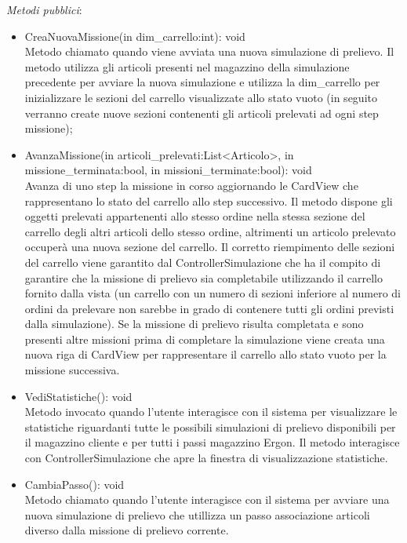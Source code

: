 \textit{Metodi pubblici}:\\
\begin{itemize}
    \item CreaNuovaMissione(in dim\_carrello:int): void\\
    Metodo chiamato quando viene avviata una nuova simulazione di prelievo. Il metodo utilizza gli articoli presenti nel magazzino della simulazione precedente per avviare la nuova simulazione e utilizza 
    la dim\_carrello per inizializzare le sezioni del carrello visualizzate allo stato vuoto (in seguito verranno create nuove sezioni contenenti gli articoli prelevati ad ogni step missione);
    \item AvanzaMissione(in articoli\_prelevati:List<Articolo>, in missione\_terminata:bool, in missioni\_terminate:bool): void\\
    Avanza di uno step la missione in corso aggiornando le CardView che rappresentano lo stato del carrello allo step successivo.
    Il metodo dispone gli oggetti prelevati appartenenti allo stesso ordine nella stessa sezione del carrello degli altri articoli dello stesso ordine, altrimenti un articolo prelevato occuperà
    una nuova sezione del carrello. Il corretto riempimento delle sezioni del carrello viene garantito dal ControllerSimulazione che ha il compito di garantire che la missione di prelievo 
    sia completabile utilizzando il carrello fornito dalla vista (un carrello con un numero di sezioni inferiore al numero di ordini da prelevare non sarebbe in grado di contenere tutti gli ordini previsti dalla simulazione).
    Se la missione di prelievo risulta completata e sono presenti altre missioni prima di completare la simulazione viene creata una nuova riga di CardView per rappresentare il carrello allo stato 
    vuoto per la missione successiva.
    \item VediStatistiche(): void\\
    Metodo invocato quando l'utente interagisce con il sistema per visualizzare le statistiche riguardanti tutte le possibili simulazioni di prelievo disponibili per il magazzino cliente e per tutti i passi magazzino Ergon.
    Il metodo interagisce con ControllerSimulazione che apre la finestra di visualizzazione statistiche.
    \item CambiaPasso(): void\\
    Metodo chiamato quando l'utente interagisce con il sistema per avviare una nuova simulazione di prelievo che utillizza un passo associazione articoli diverso dalla missione di prelievo corrente.

\end{itemize}
